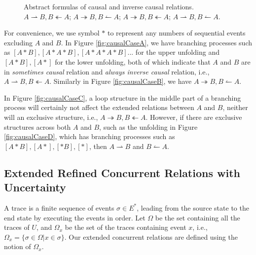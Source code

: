\documentclass[dvips,...]{llncs}
\begin{document}
\begin{figure}[htbp]
{\begin{minipage}[b]{0.45\textwidth}
	\end{minipage}
	\label{fig:causalCaseC}
}
\caption{Abstract formulas of causal and inverse causal relations.  $A\rightharpoonup B, B\twoheadleftarrow A$;  $A\twoheadrightarrow B, B\leftharpoonup A$;  $A\twoheadrightarrow B, B\twoheadleftarrow A$;  $A\rightharpoonup B, B\leftharpoonup A$.\label{fig:causalCases}}
\end{figure}

For convenience, we use symbol $*$ to represent any numbers of sequential events excluding $A$ and $B$. In Figure \ref{fig:causalCaseA}, we have branching processes such as $[A*B],[A*A*B],[A*A*A*B]...$ for the upper unfolding and $[A*B],[A*]$ for the lower unfolding, both of which indicate that $A$ and $B$ are in \textit{sometimes causal} relation and \textit{always inverse causal} relation, i.e., $A\rightharpoonup B,B\twoheadleftarrow A$. Similarly in Figure \ref{fig:causalCaseB}, we have $A\twoheadrightarrow B,B\leftharpoonup A$.

In Figure \ref{fig:causalCaseC}, a loop structure in the middle part of a branching process will certainly not affect the extended relations between $A$ and $B$, neither will an exclusive structure, i.e., $A\twoheadrightarrow B,B\twoheadleftarrow A$. However, if there are exclusive structures across both $A$ and $B$, such as the unfolding in Figure \ref{fig:causalCaseD}, which has branching processes such as $[A*B],[A*],[*B],[*]$, then $A\rightharpoonup B$ and $B\leftharpoonup A$.

\subsection{Extended Refined Concurrent Relations with Uncertainty}\label{subsec:concurrent}
A trace is a finite sequence of events $\sigma\in E^{*}$, leading from the source state to the end state by executing the events in order. Let $\Omega$ be the set containing all the traces of $U$, and $\Omega_{x}$ be the set of the traces containing event $x$, i.e., $\Omega_{x}=\{\sigma\in\Omega|x\in\sigma\}$. Our extended concurrent relations are defined using the notion of $\Omega_{x}$.
\end{document}
